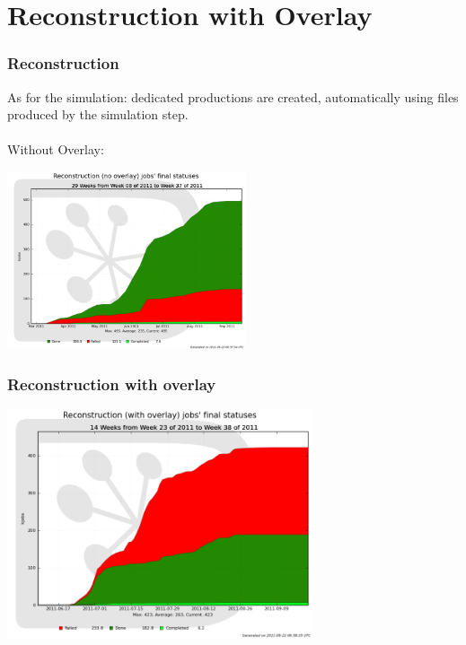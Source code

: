 \documentclass{beamer}
\begin{document}
\section{Reconstruction with Overlay}
\begin{frame}
\frametitle{Reconstruction}
 As for the simulation: dedicated productions are created, automatically using files produced by the simulation step.\\
~\\
Without Overlay:\\
\begin{center}
\includegraphics[width=7cm]{RecoNoOverlayStatus}
\end{center}
\end{frame}
\begin{frame}
\frametitle{Reconstruction with overlay}
\begin{center}
\includegraphics[width=9cm]{RecoOverlayStatus} 
\end{center}
\end{frame}
\end{document}
